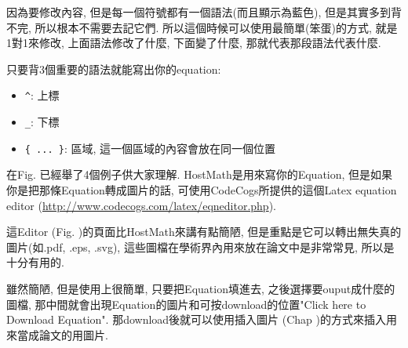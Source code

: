 因為要修改內容, 但是每一個符號都有一個語法(而且顯示為藍色), 但是其實多到背不完, 所以根本不需要去記它們. 所以這個時候可以使用最簡單(笨蛋)的方式, 就是1對1來修改, 上面語法修改了什麼, 下面變了什麼, 那就代表那段語法代表什麼.

只要背3個重要的語法就能寫出你的equation:
  \begin{itemize}
    \item \verb|^|: 上標
    \item \verb|_|: 下標
    \item \verb|{ ... }|: 區域, 這一個區域的內容會放在同一個位置
  \end{itemize}

在Fig. 已經舉了4個例子供大家理解.
\newpage
{}
HostMath是用來寫你的Equation, 但是如果你是把那條Equation轉成圖片的話, 可使用CodeCogs所提供的這個Latex equation editor (\url{http://www.codecogs.com/latex/eqneditor.php}).

這Editor (Fig. )的頁面比HostMath來講有點簡陋, 但是重點是它可以轉出無失真的圖片(如.pdf, .eps, .svg), 這些圖檔在學術界內用來放在論文中是非常常見, 所以是十分有用的.


雖然簡陋, 但是使用上很簡單, 只要把Equation填進去, 之後選擇要ouput成什麼的圖檔, 那中間就會出現Equation的圖片和可按download的位置"Click here to Download Equation". 那download後就可以使用插入圖片 (Chap )的方式來插入用來當成論文的用圖片.

